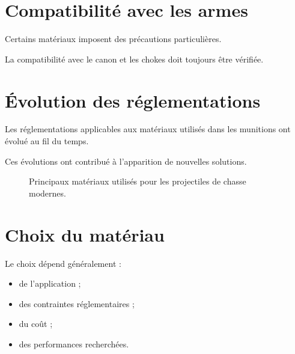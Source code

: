 \section{Compatibilité avec les armes}

Certains matériaux imposent des précautions particulières.

La compatibilité avec le canon et les chokes doit toujours être vérifiée.

\section{Évolution des réglementations}

Les réglementations applicables aux matériaux utilisés dans les munitions ont
évolué au fil du temps.

Ces évolutions ont contribué à l'apparition de nouvelles solutions.

\begin{figure}[htbp]
\centering


\caption{Principaux matériaux utilisés pour les projectiles de chasse modernes.}
\label{fig:arbre_materiaux}

\end{figure}

\section{Choix du matériau}

Le choix dépend généralement :

\begin{itemize}
    \item de l'application ;
    \item des contraintes réglementaires ;
    \item du coût ;
    \item des performances recherchées.
\end{itemize}

